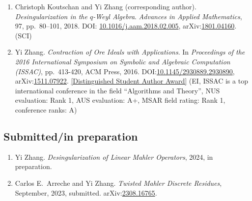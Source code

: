\documentclass[a4paper,12pt]{article}
\begin{document}
\begin{enumerate}
{\em On (shape-)Wilf-equivalence for Words}, 
{\em  Advances in Applied Mathematics} , 100, pp.\ 87-100, 2018. 
DOI:\href{https://doi.org/10.1016/j.aam.2018.05.006}{10.1016/j.aam.2018.05.006}, 
arXiv:\href{https://arxiv.org/pdf/1802.09856.pdf}{1802.09856}. (SCI)
\item Christoph Koutschan and Yi Zhang (corresponding author). {\em Desingularization in the $q$-Weyl Algebra}. 
{\em Advances in Applied Mathematics}, 97, pp.\ 80–101, 2018. 
DOI: \href{http://dx.doi.org/10.1016/j.aam.2018.02.005}{10.1016/j.aam.2018.02.005},
arXiv:\href{https://arxiv.org/abs/1801.04160}{1801.04160}. (SCI) 
\item Yi Zhang. {\em Contraction of Ore Ideals with Applications}. 
In {\em Proceedings of the 2016 International Symposium on Symbolic and Algebraic Computation (ISSAC)}, 
pp.\ 413-420, ACM Press, 2016. DOI:\href{http://dl.acm.org/citation.cfm?id=2930890}{10.1145/2930889.2930890},
arXiv:\href{https://arxiv.org/abs/1511.07922}{1511.07922}. 
\href{https://www.sigsam.org/Awards/ISSACAwards.html}{[Distinguished Student Author Award]} 
(EI, ISSAC is a top international conference in the field ``Algorithms and Theory'', NUS evaluation: Rank 1, AUS evaluation: A+, MSAR field rating: Rank 1, conference ranks: A) 
\end{enumerate}

\subsection*{Submitted/in preparation}
\begin{enumerate}
\item Yi Zhang. 
{\em Desingularization of Linear Mahler Operators}, 2024, in preparation.
\item  Carlos E.\ Arreche and Yi Zhang. {\em Twisted Mahler Discrete Residues}, September, 2023, submitted. 
arXiv:\href{https://arxiv.org/abs/2308.16765}{2308.16765}. 

\end{enumerate}
\end{document}
